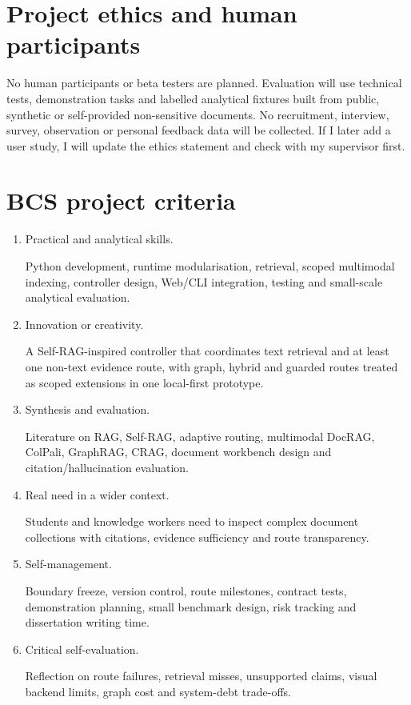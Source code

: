 \documentclass[a4paper,11pt]{article}
\begin{document}
\section{Project ethics and human participants}

No human participants or beta testers are planned. Evaluation will use technical tests, demonstration tasks and labelled analytical fixtures built from public, synthetic or self-provided non-sensitive documents. No recruitment, interview, survey, observation or personal feedback data will be collected. If I later add a user study, I will update the ethics statement and check with my supervisor first.

\section{BCS project criteria}

\begin{enumerate}
\item
Practical and analytical skills.

Python development, runtime modularisation, retrieval, scoped multimodal indexing, controller design, Web/CLI integration, testing and small-scale analytical evaluation.

\item
Innovation or creativity.

A Self-RAG-inspired controller that coordinates text retrieval and at least one non-text evidence route, with graph, hybrid and guarded routes treated as scoped extensions in one local-first prototype.

\item
Synthesis and evaluation.

Literature on RAG, Self-RAG, adaptive routing, multimodal DocRAG, ColPali, GraphRAG, CRAG, document workbench design and citation/hallucination evaluation.

\item
Real need in a wider context.

Students and knowledge workers need to inspect complex document collections with citations, evidence sufficiency and route transparency.

\item
Self-management.

Boundary freeze, version control, route milestones, contract tests, demonstration planning, small benchmark design, risk tracking and dissertation writing time.

\item
Critical self-evaluation.

Reflection on route failures, retrieval misses, unsupported claims, visual backend limits, graph cost and system-debt trade-offs.
\end{enumerate}
\end{document}
